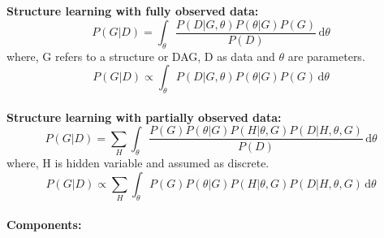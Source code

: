 \documentclass[]{article}
\begin{document}
	
\textbf{Structure learning with fully observed data:} \\
\begin{equation}\label{eq:equation1}
P\left(G  \vert D \right) = \int_\theta \frac{ P\left(D \vert G,\theta \right) P\left(\theta  \vert G \right) P\left(G \right) } { P\left(D \right) }\,\mathrm{d}\theta
\end{equation}
where, G refers to a structure or DAG, D as data and $\theta$ are parameters.\\
\begin{equation}\label{eq:equation2}
P\left(G \vert D \right) \propto \int_\theta P\left(D \vert G,\theta \right) P\left(\theta \vert G \right) P\left(G \right) \,\mathrm{d}\theta
\end{equation}
 \\
\textbf{Structure learning with partially observed data:} \\
\begin{equation}\label{eq:equation3}
P\left(G \vert D \right) = \sum_{ H } \int_\theta  \frac{ P\left(G \right) P\left( \theta \vert G \right) P\left(H \vert \theta, G \right) P\left(D \vert H, \theta, G \right)  } { P\left(D \right) }\,\mathrm{d}\theta
\end{equation}
where, H is hidden variable and assumed as discrete.\\
\begin{equation}\label{eq:equation4}
P\left(G \vert D \right) \propto \sum_{ H } \int_\theta   P\left(G \right) P\left( \theta \vert G \right) P\left(H \vert \theta, G \right) P\left(D \vert H, \theta, G \right) \,\mathrm{d}\theta
\end{equation}
 \\

\textbf{Components:}
\end{document}
